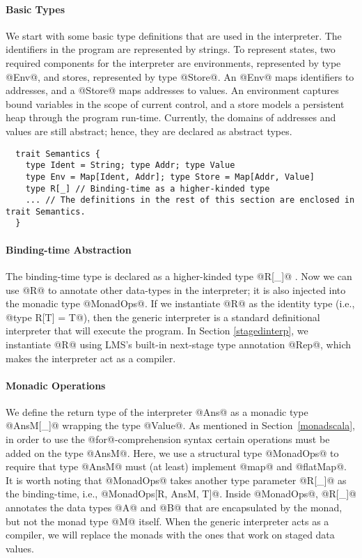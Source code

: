 \paragraph{Basic Types} We start with some basic type definitions that are used
in the interpreter. The identifiers in the program are represented by strings.
To represent states, two required components for the interpreter are
environments, represented by type @Env@, and stores, represented by type
@Store@. An @Env@ maps identifiers to addresses, and a @Store@ maps addresses to
values. An environment captures bound variables in the scope of current control, and
a store models a persistent heap through the program run-time.  Currently,
the domains of addresses and values are still abstract; hence, they are
declared as abstract types.
\begin{lstlisting}
  trait Semantics {
    type Ident = String; type Addr; type Value
    type Env = Map[Ident, Addr]; type Store = Map[Addr, Value]
    type R[_] // Binding-time as a higher-kinded type
    ... // The definitions in the rest of this section are enclosed in trait Semantics.
  }
\end{lstlisting}

\paragraph{Binding-time Abstraction}
The binding-time type is declared as a higher-kinded type @R[_]@ \cite{Ofenbeck:2017:SGP:3136040.3136060}.
Now we can use @R@ to annotate other data-types in the interpreter;
it is also injected into the monadic type @MonadOps@.  If we instantiate
@R@ as the identity type (i.e., @type R[T] = T@), then the generic interpreter is a
standard definitional interpreter that will execute the program.  In Section
\ref{stagedinterp}, we instantiate @R@ using LMS's built-in next-stage
type annotation @Rep@, which makes the interpreter act as a compiler.

\paragraph{Monadic Operations} We define the return type of the interpreter
@Ans@ as a monadic type @AnsM[_]@ wrapping the type @Value@.
As mentioned in Section~\ref{monadscala}, in order to use the @for@-comprehension
syntax certain operations must be added on the type @AnsM@. Here, we use a
structural type @MonadOps@ to require that type @AnsM@ must (at least)
implement @map@ and @flatMap@. It is worth noting that @MonadOps@ takes another
type parameter @R[_]@ as the binding-time, i.e., @MonadOps[R, AnsM, T]@.
Inside @MonadOps@, @R[_]@ annotates the data types @A@ and @B@ that are
encapsulated by the monad, but not the monad type @M@ itself. When the generic
interpreter acts as a compiler, we will replace the monads with the ones that
work on staged data values.


